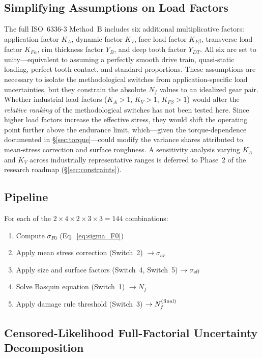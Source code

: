 \documentclass[12pt,a4paper]{article}
\begin{document}
\subsection{Simplifying Assumptions on Load Factors}

The full ISO~6336-3 Method~B includes six additional multiplicative
factors: application factor $K_A$, dynamic factor $K_V$, face load
factor $K_{F\beta}$, transverse load factor $K_{F\alpha}$, rim
thickness factor $Y_B$, and deep tooth factor $Y_{DT}$. All six are set
to unity---equivalent to assuming a perfectly smooth drive train,
quasi-static loading, perfect tooth contact, and standard proportions.
These assumptions are necessary to isolate the methodological switches
from application-specific load uncertainties, but they constrain the
absolute $N_f$ values to an idealized gear pair. Whether industrial load
factors ($K_A > 1$, $K_V > 1$, $K_{F\beta} > 1$) would alter the
\emph{relative ranking} of the methodological switches has not been
tested here. Since higher load factors increase the effective stress,
they would shift the operating point further above the endurance limit,
which---given the torque-dependence documented in
\S\ref{sec:torque}---could modify the variance shares attributed to
mean-stress correction and surface roughness. A sensitivity analysis
varying $K_A$ and $K_V$ across industrially representative ranges is
deferred to Phase~2 of the research roadmap (\S\ref{sec:constraints}).

\subsection{Pipeline}

For each of the $2\times4\times2\times3\times3 = 144$ combinations:
\begin{enumerate}
  \item Compute $\sigma_{F0}$ (Eq.~\ref{eq:sigma_F0})
  \item Apply mean stress correction (Switch~2) $\rightarrow \sigma_{ar}$
  \item Apply size and surface factors (Switch~4, Switch~5)
        $\rightarrow \sigma_{\rm eff}$
  \item Solve Basquin equation (Switch~1) $\rightarrow N_f$
  \item Apply damage rule threshold (Switch~3)
        $\rightarrow N_f^{\rm (final)}$
\end{enumerate}

\subsection{Censored-Likelihood Full-Factorial Uncertainty Decomposition}
\end{document}
